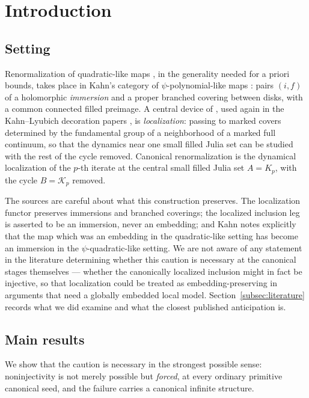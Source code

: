 \documentclass[11pt,reqno]{amsart}
\theoremstyle{definition}
\theoremstyle{remark}
\begin{document}
\maketitle
\tableofcontents

\section{Introduction}\label{sec:intro}

\subsection{Setting}
Renormalization of quadratic-like maps \cite{DH85}, in the generality
needed for
a priori bounds, takes place in Kahn's category of
$\psi$-polynomial-like maps \cite{KahnPrimitive06}: pairs $(i,f)$ of a
holomorphic \emph{immersion} and a proper branched covering between
disks, with a common connected filled preimage.  A central device of
\cite{KahnPrimitive06}, used again in the Kahn--Lyubich decoration
papers \cite{KLDecorations08,KLPrincipal09}, is \emph{localization}: passing to marked
covers determined by the fundamental group of a neighborhood of a marked
full continuum, so that the dynamics near one small filled Julia set can
be studied with the rest of the cycle removed.  Canonical
renormalization is the dynamical localization of the $p$-th iterate at
the central small filled Julia set $A=K_p$, with the cycle
$B=\mathcal K_p$ removed.

The sources are careful about what this construction preserves.  The
localization functor preserves immersions and branched coverings; the
localized inclusion leg is asserted to be an immersion, never an
embedding; and Kahn notes explicitly that the map which was an embedding
in the quadratic-like setting has become an immersion in the
$\psi$-quadratic-like setting.  We are not aware of any statement in
the literature determining whether this caution is necessary at the
canonical stages themselves --- whether the canonically localized
inclusion might in fact be injective, so that localization could be
treated as embedding-preserving in arguments that need a globally
embedded local model.  Section~\ref{subsec:literature} records what we
did examine and what the closest published anticipation is.

\subsection{Main results}
We show that the caution is necessary in the strongest possible sense:
noninjectivity is not merely possible but \emph{forced}, at every
ordinary primitive canonical seed, and the failure carries a canonical
infinite structure.
\end{document}

